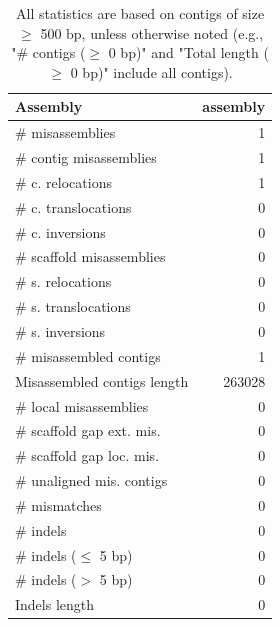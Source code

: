 \documentclass[12pt,a4paper]{article}
\begin{document}
\begin{table}[ht]
\begin{center}
\caption{All statistics are based on contigs of size $\geq$ 500 bp, unless otherwise noted (e.g., "\# contigs ($\geq$ 0 bp)" and "Total length ($\geq$ 0 bp)" include all contigs).}
\begin{tabular}{|l*{1}{|r}|}
\hline
Assembly & assembly \\ \hline
\# misassemblies & 1 \\ \hline
\hspace{2mm}\# contig misassemblies & 1 \\ \hline
\hspace{5mm}\# c. relocations & 1 \\ \hline
\hspace{5mm}\# c. translocations & 0 \\ \hline
\hspace{5mm}\# c. inversions & 0 \\ \hline
\hspace{2mm}\# scaffold misassemblies & 0 \\ \hline
\hspace{5mm}\# s. relocations & 0 \\ \hline
\hspace{5mm}\# s. translocations & 0 \\ \hline
\hspace{5mm}\# s. inversions & 0 \\ \hline
\# misassembled contigs & 1 \\ \hline
Misassembled contigs length & 263028 \\ \hline
\# local misassemblies & 0 \\ \hline
\# scaffold gap ext. mis. & 0 \\ \hline
\# scaffold gap loc. mis. & 0 \\ \hline
\# unaligned mis. contigs & 0 \\ \hline
\# mismatches & 0 \\ \hline
\# indels & 0 \\ \hline
\hspace{5mm}\# indels ($\leq$ 5 bp) & 0 \\ \hline
\hspace{5mm}\# indels ($>$ 5 bp) & 0 \\ \hline
Indels length & 0 \\ \hline
\end{tabular}
\end{center}
\end{table}
\end{document}
